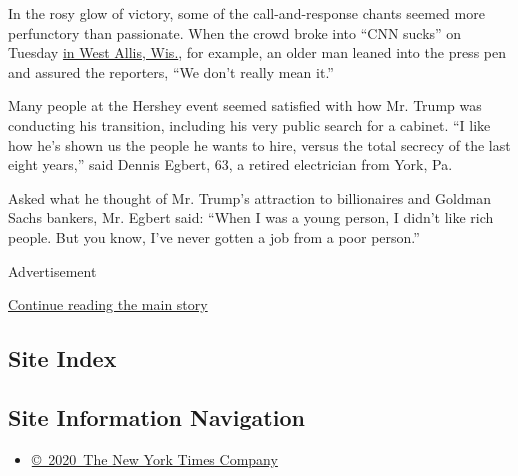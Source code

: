 In the rosy glow of victory, some of the call-and-response chants seemed
more perfunctory than passionate. When the crowd broke into ``CNN
sucks'' on Tuesday
\href{https://www.nytimes3xbfgragh.onion/2016/12/13/us/donald-trump-victory-tour.html}{in
West Allis, Wis.}, for example, an older man leaned into the press pen
and assured the reporters, ``We don't really mean it.''

Many people at the Hershey event seemed satisfied with how Mr. Trump was
conducting his transition, including his very public search for a
cabinet. ``I like how he's shown us the people he wants to hire, versus
the total secrecy of the last eight years,'' said Dennis Egbert, 63, a
retired electrician from York, Pa.

Asked what he thought of Mr. Trump's attraction to billionaires and
Goldman Sachs bankers, Mr. Egbert said: ``When I was a young person, I
didn't like rich people. But you know, I've never gotten a job from a
poor person.''

Advertisement

\protect\hyperlink{after-bottom}{Continue reading the main story}

\hypertarget{site-index}{%
\subsection{Site Index}\label{site-index}}

\hypertarget{site-information-navigation}{%
\subsection{Site Information
Navigation}\label{site-information-navigation}}

\begin{itemize}
\tightlist
\item
  \href{https://help.nytimes3xbfgragh.onion/hc/en-us/articles/115014792127-Copyright-notice}{©~2020~The
  New York Times Company}
\end{itemize}

